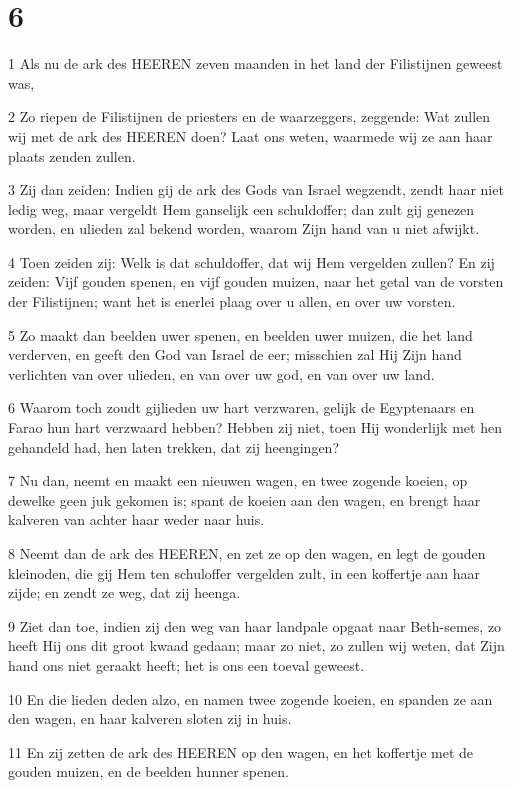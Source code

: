 \chapter{6}

\par 1 Als nu de ark des HEEREN zeven maanden in het land der Filistijnen geweest was,
\par 2 Zo riepen de Filistijnen de priesters en de waarzeggers, zeggende: Wat zullen wij met de ark des HEEREN doen? Laat ons weten, waarmede wij ze aan haar plaats zenden zullen.
\par 3 Zij dan zeiden: Indien gij de ark des Gods van Israel wegzendt, zendt haar niet ledig weg, maar vergeldt Hem ganselijk een schuldoffer; dan zult gij genezen worden, en ulieden zal bekend worden, waarom Zijn hand van u niet afwijkt.
\par 4 Toen zeiden zij: Welk is dat schuldoffer, dat wij Hem vergelden zullen? En zij zeiden: Vijf gouden spenen, en vijf gouden muizen, naar het getal van de vorsten der Filistijnen; want het is enerlei plaag over u allen, en over uw vorsten.
\par 5 Zo maakt dan beelden uwer spenen, en beelden uwer muizen, die het land verderven, en geeft den God van Israel de eer; misschien zal Hij Zijn hand verlichten van over ulieden, en van over uw god, en van over uw land.
\par 6 Waarom toch zoudt gijlieden uw hart verzwaren, gelijk de Egyptenaars en Farao hun hart verzwaard hebben? Hebben zij niet, toen Hij wonderlijk met hen gehandeld had, hen laten trekken, dat zij heengingen?
\par 7 Nu dan, neemt en maakt een nieuwen wagen, en twee zogende koeien, op dewelke geen juk gekomen is; spant de koeien aan den wagen, en brengt haar kalveren van achter haar weder naar huis.
\par 8 Neemt dan de ark des HEEREN, en zet ze op den wagen, en legt de gouden kleinoden, die gij Hem ten schuloffer vergelden zult, in een koffertje aan haar zijde; en zendt ze weg, dat zij heenga.
\par 9 Ziet dan toe, indien zij den weg van haar landpale opgaat naar Beth-semes, zo heeft Hij ons dit groot kwaad gedaan; maar zo niet, zo zullen wij weten, dat Zijn hand ons niet geraakt heeft; het is ons een toeval geweest.
\par 10 En die lieden deden alzo, en namen twee zogende koeien, en spanden ze aan den wagen, en haar kalveren sloten zij in huis.
\par 11 En zij zetten de ark des HEEREN op den wagen, en het koffertje met de gouden muizen, en de beelden hunner spenen.
